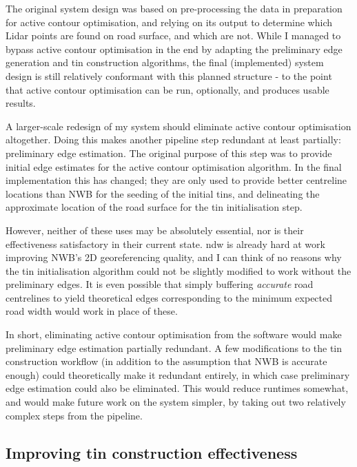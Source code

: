 The original system design was based on pre-processing the data in preparation for active contour optimisation, and relying on its output to determine which Lidar points are found on road surface, and which are not. While I managed to bypass active contour optimisation in the end by adapting the preliminary edge generation and \ac{tin} construction algorithms, the final (implemented) system design is still relatively conformant with this planned structure - to the point that active contour optimisation can be run, optionally, and produces usable results.

A larger-scale redesign of my system should eliminate active contour optimisation altogether. Doing this makes another pipeline step redundant at least partially: preliminary edge estimation. The original purpose of this step was to provide initial edge estimates for the active contour optimisation algorithm. In the final implementation this has changed; they are only used to provide better centreline locations than NWB for the seeding of the initial \ac{tin}s, and delineating the approximate location of the road surface for the \ac{tin} initialisation step.

However, neither of these uses may be absolutely essential, nor is their effectiveness satisfactory in their current state. \ac{ndw} is already hard at work improving NWB's 2D georeferencing quality, and I can think of no reasons why the \ac{tin} initialisation algorithm could not be slightly modified to work without the preliminary edges. It is even possible that simply buffering \textit{accurate} road centrelines to yield theoretical edges corresponding to the minimum expected road width would work in place of these.

In short, eliminating active contour optimisation from the software would make preliminary edge estimation partially redundant. A few modifications to the \ac{tin} construction workflow (in addition to the assumption that NWB is accurate enough) could theoretically make it redundant entirely, in which case preliminary edge estimation could also be eliminated. This would reduce runtimes somewhat, and would make future work on the system simpler, by taking out two relatively complex steps from the pipeline.

\subsection{Improving \ac{tin} construction effectiveness}
\label{sub:improvementstinconstruction}

